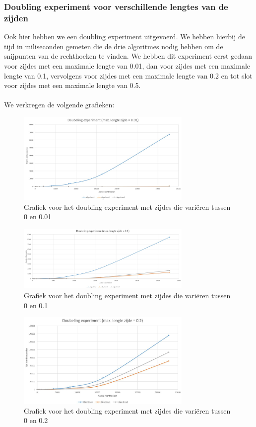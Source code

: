 \documentclass[11pt,a4paper,titlepage]{article}
\begin{document}
			\subsubsection{Doubling experiment voor verschillende lengtes van de zijden}
				Ook hier hebben we een doubling experiment uitgevoerd. We hebben hierbij de tijd in miliseconden gemeten die de drie algoritmes nodig hebben om de snijpunten van de rechthoeken te vinden. We hebben dit experiment eerst gedaan voor zijdes met een maximale lengte van 0.01, dan voor zijdes met een maximale lengte van 0.1, vervolgens voor zijdes met een maximale lengte van 0.2 en tot slot voor zijdes met een maximale lengte van 0.5.\\ \\
				We verkregen de volgende grafieken:
				\begin{figure}[H]
				\centering
				\includegraphics[width=0.75\textwidth]{zijde001.JPG}
				\caption{\label{fig:zijde001}Grafiek voor het doubling experiment met zijdes die variëren tussen 0 en 0.01}
				\end{figure}
				\begin{figure}[H]
				\centering
				\includegraphics[width=0.75\textwidth]{zijde01.JPG}
				\caption{\label{fig:zijde01}Grafiek voor het doubling experiment met zijdes die variëren tussen 0 en 0.1}
				\end{figure}
				\begin{figure}[H]
				\centering
				\includegraphics[width=0.75\textwidth]{zijde02.JPG}
				\caption{\label{fig:zijde02}Grafiek voor het doubling experiment met zijdes die variëren tussen 0 en 0.2}
				\end{figure}
\end{document}
